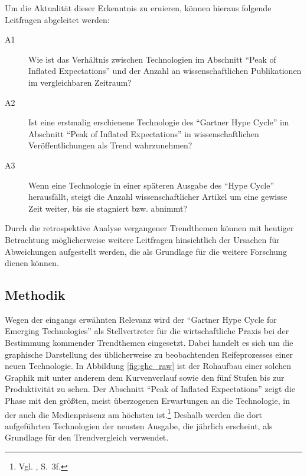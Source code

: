 Um die Aktualität dieser Erkenntnis zu eruieren, können hieraus folgende Leitfragen abgeleitet werden:

\begin{description}
	\item[A1] Wie ist das Verhältnis zwischen Technologien im Abschnitt "`Peak of Inflated Expectations"' und der Anzahl an wissenschaftlichen Publikationen im vergleichbaren Zeitraum?
\end{description}

\begin{description}
	\item[A2] Ist eine erstmalig erschienene Technologie des "`Gartner Hype Cycle"' im Ab\-schnitt "`Peak of Inflated Expectations"' in wissen\-schaftlichen Ver\-öf\-fent\-lichungen als Trend wahrzunehmen?
\end{description}

\begin{description}
	\item[A3] Wenn eine Technologie in einer späteren Ausgabe des "`Hype Cycle"' herausfällt, steigt die Anzahl wissenschaftlicher Artikel um eine gewisse Zeit weiter, bis sie stagniert bzw. abnimmt?
\end{description}

Durch die retrospektive Analyse vergangener Trendthemen können mit heutiger Betrachtung möglicherweise weitere Leitfragen hinsichtlich der Ursachen für Abweichungen aufgestellt werden, die als Grundlage für die weitere Forschung dienen können.

\subsection{Methodik}
Wegen der eingangs erwähnten Relevanz wird der "`Gartner Hype Cycle for Emerging Technologies"' als Stellvertreter für die wirtschaftliche Praxis bei der Bestimmung kommender Trendthemen eingesetzt. Dabei handelt es sich um die graphische Darstellung des üblicherweise zu beobachtenden Reifeprozesses einer neuen Technologie. In Abbildung \ref{fig:ghc_raw} ist der Rohaufbau einer solchen Graphik mit unter anderem dem Kurvenverlauf sowie den fünf Stufen bis zur Produktivität zu sehen. Der Abschnitt "`Peak of Inflated Expectations"' zeigt die Phase mit den größten, meist überzogenen Erwartungen an die Technologie, in der auch die Medienpräsenz am höchsten ist.\footnote{Vgl. , S.~3f.} Deshalb werden die dort aufgeführten Technologien der neusten Ausgabe, die jährlich erscheint, als Grundlage für den Trendvergleich verwendet.

